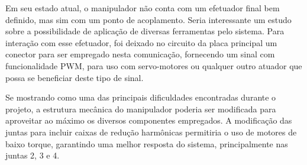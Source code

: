 Em seu estado atual, o manipulador não conta com um efetuador final bem definido, mas sim com um ponto 
de acoplamento. Seria interessante um estudo sobre a possibilidade de aplicação de diversas ferramentas 
pelo sistema. Para interação com esse efetuador, foi deixado no circuito da placa principal um conector
para ser empregado nesta comunicação, fornecendo um sinal com funcionalidade PWM, para uso com servo-motores 
ou qualquer outro atuador que possa se beneficiar deste tipo de sinal.

Se mostrando como uma das principais dificuldades encontradas durante o projeto, a estrutura mecânica do 
manipulador poderia ser modificada para aproveitar ao máximo os diversos componentes empregados. A 
modificação das juntas para incluir caixas de redução harmônicas permitiria o uso de motores de baixo 
torque, garantindo uma melhor resposta do sistema, principalmente nas juntas 2, 3 e 4.